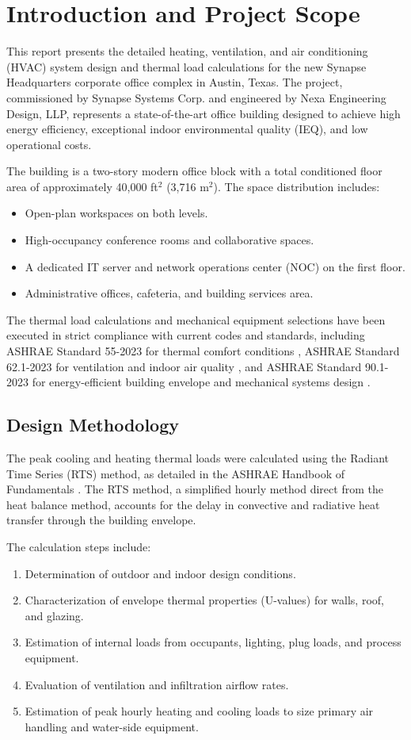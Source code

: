 \section{Introduction and Project Scope}
\label{sec:introduction}

This report presents the detailed heating, ventilation, and air conditioning (HVAC) system design and thermal load calculations for the new Synapse Headquarters corporate office complex in Austin, Texas. The project, commissioned by Synapse Systems Corp. and engineered by Nexa Engineering Design, LLP, represents a state-of-the-art office building designed to achieve high energy efficiency, exceptional indoor environmental quality (IEQ), and low operational costs.

The building is a two-story modern office block with a total conditioned floor area of approximately 40,000 ft$^{2}$ (3,716 m$^{2}$). The space distribution includes:
\begin{itemize}
  \item Open-plan workspaces on both levels.
  \item High-occupancy conference rooms and collaborative spaces.
  \item A dedicated IT server and network operations center (NOC) on the first floor.
  \item Administrative offices, cafeteria, and building services area.
\end{itemize}

The thermal load calculations and mechanical equipment selections have been executed in strict compliance with current codes and standards, including ASHRAE Standard 55-2023 for thermal comfort conditions \cite{ashrae55}, ASHRAE Standard 62.1-2023 for ventilation and indoor air quality \cite{ashrae62}, and ASHRAE Standard 90.1-2023 for energy-efficient building envelope and mechanical systems design \cite{ashrae90}.

\subsection{Design Methodology}
The peak cooling and heating thermal loads were calculated using the Radiant Time Series (RTS) method, as detailed in the ASHRAE Handbook of Fundamentals \cite{ashraeho}. The RTS method, a simplified hourly method direct from the heat balance method, accounts for the delay in convective and radiative heat transfer through the building envelope.

The calculation steps include:
\begin{enumerate}
  \item Determination of outdoor and indoor design conditions.
  \item Characterization of envelope thermal properties (U-values) for walls, roof, and glazing.
  \item Estimation of internal loads from occupants, lighting, plug loads, and process equipment.
  \item Evaluation of ventilation and infiltration airflow rates.
  \item Estimation of peak hourly heating and cooling loads to size primary air handling and water-side equipment.
\end{enumerate}
